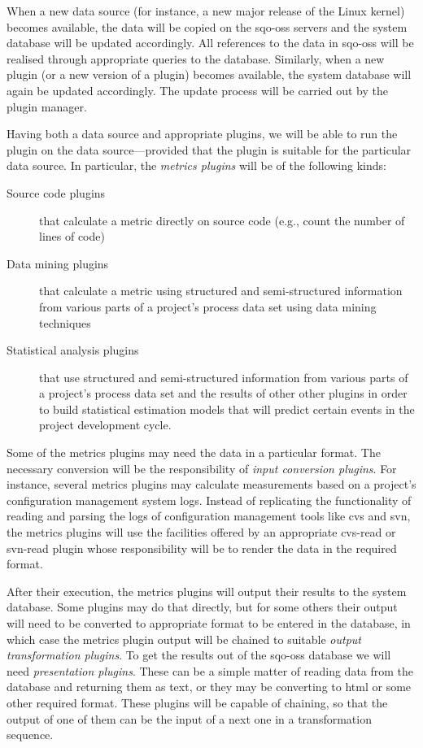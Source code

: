\documentclass{llncs}
\begin{document}
When a new data source (for instance, a new major release of the Linux
kernel) becomes available, the data will be copied on the
{\sc sqo-oss} servers and the system database will be updated
accordingly. All references to the data in {\sc sqo-oss} will be
realised through appropriate queries to the database.  Similarly, when
a new plugin (or a new version of a plugin) becomes available, the
system database will again be updated accordingly. The update process
will be carried out by the plugin manager.

Having both a data source and appropriate plugins, we will be able to
run the plugin on the data source---provided that the plugin is
suitable for the particular data source. In particular, the
\emph{metrics plugins} will be of the following kinds:
\begin{description}
\item [Source code plugins] that calculate a metric directly on source
  code (e.g., count the number of lines of code)
\item [Data mining plugins] that calculate a metric using structured
  and semi-structured information from various parts of a project's
  process data set using data mining techniques
\item [Statistical analysis plugins] that use structured and
  semi-structured information from various parts of a project's process data set
  and the results of other other plugins in order to build statistical
  estimation models that will predict certain events in the project
  development cycle.
\end{description}

Some of the metrics plugins may need the data in a particular format.
The necessary conversion will be the responsibility of \emph{input
  conversion plugins}. For instance, several metrics plugins may
calculate measurements based on a project's configuration management
system logs.
Instead of replicating the functionality of reading and
parsing the logs of configuration management tools like {\sc cvs} and {\sc svn}, the metrics plugins will use
the facilities offered by an appropriate {\sc cvs}-read or {\sc
  svn}-read plugin whose responsibility will be to render the data in
the required format.

After their execution, the metrics plugins will output their results
to the system database. Some plugins may do that directly, but for
some others their output will need to be converted to appropriate
format to be entered in the database, in which case the metrics plugin
output will be chained to suitable \emph{output transformation
  plugins}. To get the results out of the {\sc sqo-oss} database we will 
need \emph{presentation plugins}. These can be a simple matter of 
reading data from the database and returning them as text, or they may 
be converting to {\sc html} or some other required format. These plugins
will be capable of chaining, so that the output of one of them can be
the input of a next one in a transformation sequence.
\end{document}
